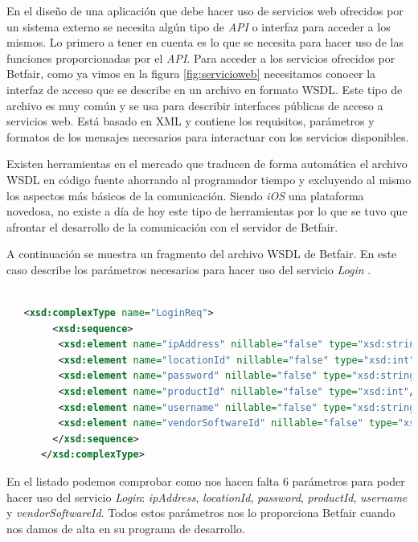   En el diseño de una aplicación que debe hacer uso de servicios web ofrecidos por un sistema externo se necesita algún tipo de \emph{API} o interfaz para acceder a los mismos. Lo primero a tener en cuenta es lo que se necesita para hacer uso de las funciones proporcionadas por el \emph{API}. Para acceder a los servicios ofrecidos por Betfair, como ya vimos en la figura \ref{fig:servicioweb} necesitamos conocer la interfaz de acceso que se describe  en un archivo en formato WSDL. Este tipo de archivo es muy común y se usa para describir interfaces públicas de acceso a servicios web. Está basado en XML y contiene los requisitos, parámetros y formatos de los mensajes necesarios para interactuar con los servicios disponibles. 
   
   Existen herramientas en el mercado que traducen de forma automática el archivo WSDL en código fuente ahorrando al programador tiempo y excluyendo al mismo los aspectos más básicos de la comunicación. Siendo \emph{iOS} una plataforma novedosa, no existe a día de hoy este tipo de herramientas por lo que se tuvo que afrontar el desarrollo de la comunicación con el servidor de Betfair.
      
   A continuación se muestra un fragmento del archivo WSDL de Betfair. En este caso describe los parámetros necesarios para hacer uso del servicio \emph{Login }.
   
\begin{lstlisting}[frame=single, language=xml,basicstyle=\small, keywordstyle = \color{blue}]

   <xsd:complexType name="LoginReq">
        <xsd:sequence>
         <xsd:element name="ipAddress" nillable="false" type="xsd:string"/>
         <xsd:element name="locationId" nillable="false" type="xsd:int"/>
         <xsd:element name="password" nillable="false" type="xsd:string"/>
         <xsd:element name="productId" nillable="false" type="xsd:int"/>
         <xsd:element name="username" nillable="false" type="xsd:string"/>
         <xsd:element name="vendorSoftwareId" nillable="false" type="xsd:int"/>
        </xsd:sequence>
      </xsd:complexType>
\end{lstlisting}

   En el listado podemos comprobar como nos hacen falta 6 parámetros para poder hacer uso del servicio \emph{Login}: \emph{ipAddress}, \emph{locationId}, \emph{password}, \emph{productId}, \emph{username} y \emph{vendorSoftwareId}. Todos estos parámetros nos lo proporciona Betfair cuando nos damos de alta en su programa de desarrollo.
   

